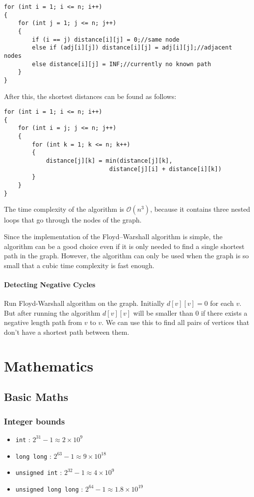 \documentclass[twoside,12pt,a4paper,english]{book}
\theoremstyle{definition}
\theoremstyle{problemstyle}
\begin{document}
\begin{lstlisting}
for (int i = 1; i <= n; i++) 
{
    for (int j = 1; j <= n; j++) 
    {
        if (i == j) distance[i][j] = 0;//same node
        else if (adj[i][j]) distance[i][j] = adj[i][j];//adjacent nodes
        else distance[i][j] = INF;//currently no known path
    }
}
\end{lstlisting}
After this, the shortest distances can be found as follows:
\begin{lstlisting}
for (int i = 1; i <= n; i++) 
{
    for (int i = j; j <= n; j++) 
    {
        for (int k = 1; k <= n; k++) 
        {
            distance[j][k] = min(distance[j][k], 
                              distance[j][i] + distance[i][k])
        }
    }
}
\end{lstlisting}

The time complexity of the algorithm is $\mathcal{O}(n^3)$,
because it contains three nested loops
that go through the nodes of the graph.

Since the implementation of the Floyd–Warshall
algorithm is simple, the algorithm can be
a good choice even if it is only needed to find a
single shortest path in the graph.
However, the algorithm can only be used when the graph
is so small that a cubic time complexity is fast enough.

\subsection{Detecting Negative Cycles}

Run Floyd-Warshall algorithm on the graph. Initially $d[v][v]=0$ for each $v$. But after running the algorithm $d[v][v]$ will be smaller than $0$ if there exists a negative length path from $v$ to $v$. We can use this to find all pairs of vertices that don't have a shortest path between them.

\part{Mathematics}
\chapter{Basic Maths}

\section{Integer bounds}

\begin{itemize}
    \item\texttt{int} :  $2^{31} - 1 \approx 2\times10^9$
    \item\texttt{long long} :  $2^{63} - 1 \approx 9\times10^{18}$
    \item\texttt{unsigned int} :  $2^{32} - 1 \approx 4\times10^9$
    \item\texttt{unsigned long long} :  $2^{64} - 1 \approx 1.8\times10^{19}$
\end{itemize}
\end{document}
